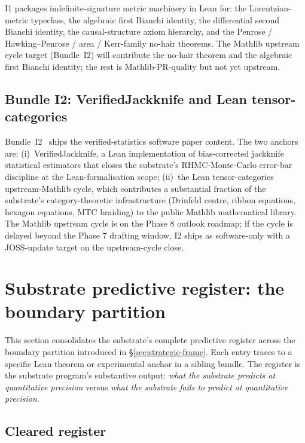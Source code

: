 \documentclass[aps,prd,reprint,nofootinbib,superscriptaddress]{revtex4-2}
\begin{document}
I1 packages indefinite-signature metric machinery in Lean for: the
Lorentzian-metric typeclass, the algebraic first Bianchi identity,
the differential second Bianchi identity, the causal-structure axiom
hierarchy, and the Penrose / Hawking--Penrose / area / Kerr-family
no-hair theorems. The Mathlib upstream cycle target (Bundle~I2) will
contribute the no-hair theorem and the algebraic first Bianchi
identity; the rest is Mathlib-PR-quality but not yet upstream.

\subsection{Bundle I2: VerifiedJackknife and Lean tensor-categories}

Bundle~I2~\cite{Roehm2026Strategy} ships the verified-statistics
software paper content. The two anchors are: (i)~VerifiedJackknife,
a Lean implementation of bias-corrected jackknife statistical estimators
that closes the substrate's RHMC-Monte-Carlo error-bar discipline at
the Lean-formalisation scope; (ii)~the Lean tensor-categories
upstream-Mathlib cycle, which contributes a substantial fraction of
the substrate's category-theoretic infrastructure (Drinfeld centre,
ribbon equations, hexagon equations, MTC braiding) to the public
Mathlib mathematical library. The Mathlib upstream cycle is on the
Phase 8 outlook roadmap; if the cycle is delayed beyond the Phase 7
drafting window, I2 ships as software-only with a JOSS-update target
on the upstream-cycle close.

\section{Substrate predictive register: the boundary partition}
\label{sec:substrate-register}

This section consolidates the substrate's complete predictive register
across the boundary partition introduced in \S\ref{sec:strategic-frame}.
Each entry traces to a specific Lean theorem or experimental anchor
in a sibling bundle. The register is the substrate program's
substantive output: \emph{what the substrate predicts at quantitative
precision} versus \emph{what the substrate fails to predict at
quantitative precision}.

\subsection{Cleared register}
\end{document}
